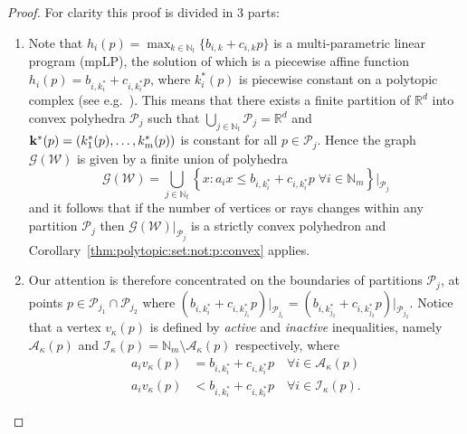 \documentclass[journal]{IEEEtran}
\theoremstyle{remark}
\theoremstyle{definition}
\begin{document}
\begin{proof}
For clarity this proof is divided in 3 parts:
\begin{enumerate}
\item Note that $h_i(p) = \max_{k\in\mathbb N_l} \{b_{i,k} + c_{i,k}p\}$ is a multi-parametric linear program (mpLP),
the solution of which is a piecewise affine function $h_i(p) = b_{i,k^\ast_i} + c_{i,k^\ast_i}p$, where $k^\ast_i(p)$ is piecewise constant on a polytopic complex (see e.g.~\cite{spjotvold:2005}).
%
This means that there exists a finite partition 
of $\mathbb R^d$ 
into convex polyhedra 
$\mathcal P_j$ such that $\bigcup_{j\in\mathbb N_t} \mathcal P_j = \mathbb R^d$ and 
${\bf{k}}^\ast(p) = (k_1^\ast(p),\dots,k_m^\ast(p))$ is constant for all $p \in \mathcal P_j$.
%
%
Hence the graph $\mathscr G(\mathcal W)$ is given by a finite union of polyhedra
%
\begin{equation*}
  \mathscr G(\mathcal W) = \bigcup_{j\in\mathbb N_t} \left\{x: a_i x \leq b_{i,k_i^\ast} + c_{i,k_i^\ast}p \; \forall i \in\mathbb N_m \right\}\bigr\vert_{\mathcal P_{j}}
\end{equation*}
%
and it follows that if the number of vertices or rays changes within any partition $\mathcal P_j$ then $\mathscr
G(\mathcal W)\vert_{\mathcal P_j}$ is a strictly convex polyhedron and Corollary~\ref{thm:polytopic:set:not:p:convex} applies.
%
\item Our attention is therefore concentrated on the boundaries of partitions $\mathcal P_j$, at points $p\in\mathcal P_{j_1} \cap \mathcal P_{j_2}$ where 
$\left(b_{i,k_i^\ast} + c_{i,k_{j_1}^\ast} p\right)\big\vert_{\mathcal P_{j_1}} = 
\left(b_{i,k_{j_2}^\ast} + c_{i,k_{j_2}^\ast} p\right)\big\vert_{\mathcal P_{j_2}}$.
%
Notice that a vertex $v_\kappa(p)$ is defined by \emph{active} and \emph{inactive} inequalities, namely $\mathcal A_\kappa(p)$ and
$\mathcal I_\kappa(p) = \mathbb N_m
\setminus\mathcal A_\kappa(p)$ respectively, where
%
\begin{equation*}\begin{split}
  a_i v_\kappa(p) &= b_{i,k_i^\ast} + c_{i,k_i^\ast} p \quad\forall i\in\mathcal A_\kappa(p)\\
  a_i v_\kappa(p) &< b_{i,k_i^\ast} + c_{i,k_i^\ast} p \quad\forall i\in\mathcal I_\kappa(p) .

\end{split}
\end{equation*}
\end{enumerate}
\end{proof}
\end{document}
